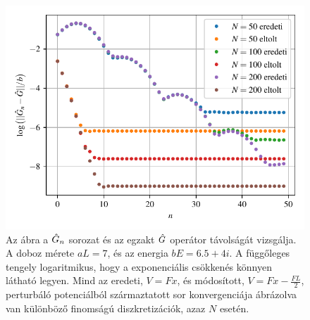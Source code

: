 \begin{figure}[H]
	\centering
	\includegraphics[scale=1]{./figs/convergencerate.pdf}
	\caption[A Green-függvény perturbációs sorának konvergencia sebessége]{Az ábra a $\hat{G}_n$ sorozat és az egzakt $\hat{G}$ operátor távolságát vizsgálja. A doboz mérete $aL=7$, és az energia $bE=6.5+4i$. A függőleges tengely logaritmikus, hogy a exponenciális csökkenés könnyen látható legyen. Mind az eredeti, $V=Fx$, és módosított, $V=Fx-\frac{FL}{2}$, perturbáló potenciálból származtatott sor konvergenciája ábrázolva van különböző finomságú diszkretizációk, azaz $N$ esetén.}
	\label{perturbation:covergencerate}
\end{figure}
